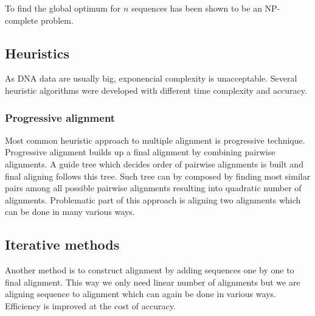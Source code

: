 To find the global optimum for $n$ sequences has been shown to be an NP-complete problem.\cite{wang1994complexity}

\subsection{Heuristics}
As DNA data are usually big, exponencial complexity is unacceptable.
Several heuristic algorithms were developed with different time complexity and accuracy.

\subsubsection{Progressive alignment}
Most common heuristic approach to multiple alignment is progressive technique.
Progressive alignment builds up a final alignment by combining pairwise alignments.
A guide tree which decides order of pairwise alignments is built and final aligning follows this tree.
Such tree can by composed by finding most similar pairs among all possible pairwise alignments resulting into
quadratic number of alignments.
Problematic part of this approach is aligning two alignments which can be done in many various ways.

\subsection{Iterative methods}
Another method is to construct alignment by adding sequences one by one to final alignment.
This way we only need linear number of alignments but we are aligning sequence to alignment which can again be done in various ways.
Efficiency is improved at the cost of accuracy.
